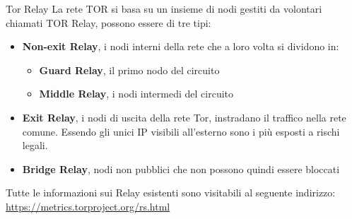 \begin{frame}{Tor Relay}
    La rete TOR si basa su un insieme di nodi gestiti da volontari chiamati TOR Relay, possono essere di tre tipi:
    \begin{itemize}
        \item \textbf{Non-exit Relay}, i nodi interni della rete che a loro volta si dividono in:
        \begin{itemize}
            \item \textbf{Guard Relay}, il primo nodo del circuito
            \item \textbf{Middle Relay}, i nodi intermedi del circuito
        \end{itemize}
        \item \textbf{Exit Relay}, i nodi di uscita della rete Tor, instradano il traffico nella rete comune. Essendo gli unici IP visibili all'esterno sono i più esposti a rischi legali.
        \item \textbf{Bridge Relay}, nodi non pubblici che non possono quindi essere bloccati
    \end{itemize}
    Tutte le informazioni sui Relay esistenti sono visitabili al seguente indirizzo: \url{https://metrics.torproject.org/rs.html}
\end{frame}
